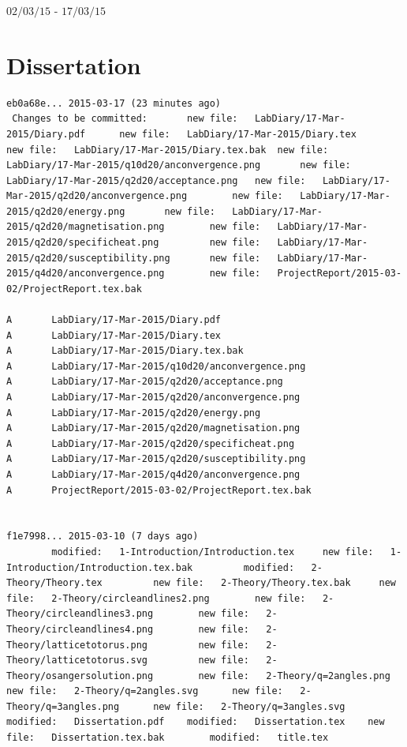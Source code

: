 \documentclass[12pt,a4paper,notitlepage,twoside]{article}
\author{Robert James}
\begin{document}
\begin{Large}
\begin{center}
$02/03/15$ - $17/03/15$
\end{center}
\end{Large}

\section{Dissertation}

\begin{lstlisting}[breaklines]
eb0a68e... 2015-03-17 (23 minutes ago)
 Changes to be committed:       new file:   LabDiary/17-Mar-2015/Diary.pdf      new file:   LabDiary/17-Mar-2015/Diary.tex      new file:   LabDiary/17-Mar-2015/Diary.tex.bak  new file:   LabDiary/17-Mar-2015/q10d20/anconvergence.png       new file:   LabDiary/17-Mar-2015/q2d20/acceptance.png   new file:   LabDiary/17-Mar-2015/q2d20/anconvergence.png        new file:   LabDiary/17-Mar-2015/q2d20/energy.png       new file:   LabDiary/17-Mar-2015/q2d20/magnetisation.png        new file:   LabDiary/17-Mar-2015/q2d20/specificheat.png         new file:   LabDiary/17-Mar-2015/q2d20/susceptibility.png       new file:   LabDiary/17-Mar-2015/q4d20/anconvergence.png        new file:   ProjectReport/2015-03-02/ProjectReport.tex.bak

A       LabDiary/17-Mar-2015/Diary.pdf
A       LabDiary/17-Mar-2015/Diary.tex
A       LabDiary/17-Mar-2015/Diary.tex.bak
A       LabDiary/17-Mar-2015/q10d20/anconvergence.png
A       LabDiary/17-Mar-2015/q2d20/acceptance.png
A       LabDiary/17-Mar-2015/q2d20/anconvergence.png
A       LabDiary/17-Mar-2015/q2d20/energy.png
A       LabDiary/17-Mar-2015/q2d20/magnetisation.png
A       LabDiary/17-Mar-2015/q2d20/specificheat.png
A       LabDiary/17-Mar-2015/q2d20/susceptibility.png
A       LabDiary/17-Mar-2015/q4d20/anconvergence.png
A       ProjectReport/2015-03-02/ProjectReport.tex.bak


f1e7998... 2015-03-10 (7 days ago)
        modified:   1-Introduction/Introduction.tex     new file:   1-Introduction/Introduction.tex.bak         modified:   2-Theory/Theory.tex         new file:   2-Theory/Theory.tex.bak     new file:   2-Theory/circleandlines2.png        new file:   2-Theory/circleandlines3.png        new file:   2-Theory/circleandlines4.png        new file:   2-Theory/latticetotorus.png         new file:   2-Theory/latticetotorus.svg         new file:   2-Theory/osangersolution.png        new file:   2-Theory/q=2angles.png      new file:   2-Theory/q=2angles.svg      new file:   2-Theory/q=3angles.png      new file:   2-Theory/q=3angles.svg      modified:   Dissertation.pdf    modified:   Dissertation.tex    new file:   Dissertation.tex.bak        modified:   title.tex


\end{lstlisting}
\end{document}
